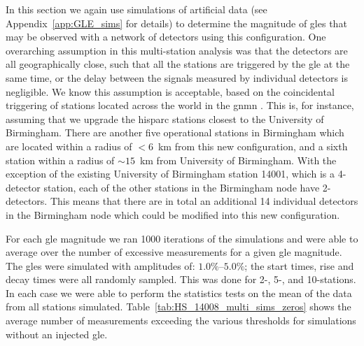 In this section we again use simulations of artificial data (see Appendix~\ref{app:GLE_sims} for details) to determine the magnitude of \glspl{gle} that may be observed with a network of detectors using this configuration. One overarching assumption in this multi-station analysis was that the detectors are all geographically close, such that all the stations are triggered by the \gls{gle} at the same time, or the delay between the signals measured by individual detectors is negligible. We know this assumption is acceptable, based on the coincidental triggering of stations located across the world in the \gls{gnmn} \citep{mishev_current_2020}. This is, for instance, assuming that we upgrade the \gls{hisparc} stations closest to the University of Birmingham. There are another five operational stations in Birmingham which are located within a radius of $<6$~km from this new configuration, and a sixth station within a radius of $\sim15$~km from University of Birmingham. With the exception of the existing University of Birmingham station 14001, which is a 4-detector station, each of the other stations in the Birmingham node have 2-detectors. This means that there are in total an additional 14 individual detectors in the Birmingham node which could be modified into this new configuration.

For each \gls{gle} magnitude we ran 1000 iterations of the simulations and were able to average over the number of excessive measurements for a given \gls{gle} magnitude. The \glspl{gle} were simulated with amplitudes of: $1.0\%$--$5.0\%$; the start times, rise and decay times were all randomly sampled. This was done for 2-, 5-, and 10-stations. In each case we were able to perform the statistics tests on the mean of the data from all stations simulated. Table~\ref{tab:HS_14008_multi_sims_zeros} shows the average number of measurements exceeding the various thresholds for simulations without an injected \gls{gle}.

\vspace{1em}

